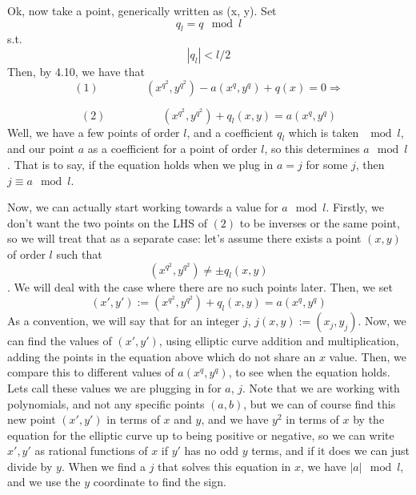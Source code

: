 \documentclass[11pt,reqno]{amsart}
\theoremstyle{definition}
\begin{document}
Ok, now take a point, generically written as (x, y). Set $$q_l = q \mod l $$s.t.$$ |q_l| < l/2$$ Then, by 4.10, we have that $$(1) \;\;\;\;\;\;\;\;\;\;  \;\;\;\;\;        
 (x^{q^2}, y^{q^2}) - a(x^q, y^q) + q(x) = 0 \Rightarrow $$ 

$$(2) \;\;\;\;\;\;\;\;\;\;\;\;\;  \;\;\;\;\;        (x^{q^2}, y^{q^2}) + q_l(x, y) = a(x^q, y^q)$$ Well, we have a few points of order $l$, and a coefficient $q_l$ which is taken $\mod l$, and our point $a$ as a coefficient for a point of order $l$, so this determines $a \mod l$. That is to say, if the equation holds when we plug in $a = j$ for some $j$, then $j \equiv a \mod l$.

Now, we can actually start working towards a value for $a \mod l$. Firstly, we don't want the two points on the LHS of $(2)$ to be inverses or the same point, so we will treat that as a separate case: let's assume there exists a point $(x, y)$ of order $l$ such that $$(x^{q^2}, y^{q^2}) \neq \pm q_l(x, y)$$. We will deal with the case where there are no such points later. Then, we set $$(x', y'):= (x^{q^2}, y^{q^2}) + q_l(x, y) = a(x^q, y^q)$$ As a convention, we will say that for an integer $j$, $j(x, y) := (x_j, y_j)$. Now, we can find the values of $(x', y')$, using elliptic curve addition and multiplication, adding the points in the equation above which do not share an $x$ value. Then, we compare this to different values of $a(x^q, y^q)$, to see when the equation holds. Lets call these values we are plugging in for $a$, $j$. Note that we are working with polynomials, and not any specific points $(a, b)$, but we can of course find this new point $(x', y')$ in terms of $x$ and $y$, and we have $y^2$ in terms of $x$ by the equation for the elliptic curve up to being positive or negative, so we can write $x', y'$ as rational functions of $x$ if $y'$ has no odd $y$ terms, and if it does we can just divide by $y$. When we find a $j$ that solves this equation in $x$, we have $|a| \mod l$, and we use the $y$ coordinate to find the sign. 
\end{document}
